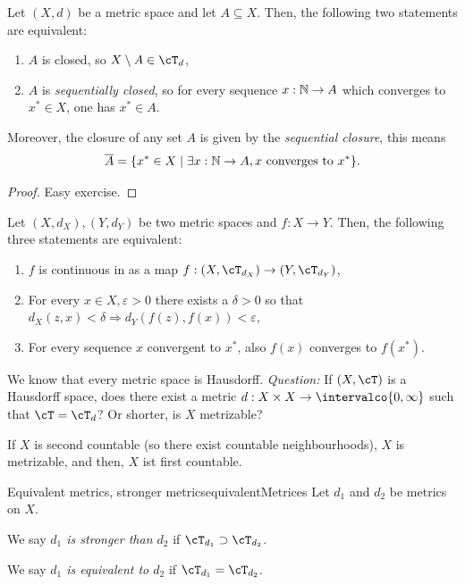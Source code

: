 \documentclass[language=english]{../../Template/TemplateLecture}
\begin{document}
\begin{prop}
    Let $(X,d)$ be a metric space and let $A \subseteq X$. Then, the following two statements are equivalent:
    \begin{enumerate}[$(i)$]
        \item $A$ is closed, so $X \setminus A \in \cT_d$,
        \item $A$ is \emph{sequentially closed}, so for every sequence $x: \mathbb{N} \to A$ which converges to $x^* \in X$, one has $x^* \in A$.
    \end{enumerate}
    Moreover, the closure of any set $A$ is given by the \emph{sequential closure}, this means 
    \begin{equation}
        \overline{A} = \{x^* \in X \mid \exists x: \mathbb{N} \to A, \text{$x$ converges to $x^*$}\}.
    \end{equation}
\end{prop}

\begin{proof}
    Easy exercise.
\end{proof}

\begin{prop}
    Let $(X, d_X), (Y, d_Y)$ be two metric spaces and $f: X \to Y$. Then, the following three statements are equivalent:
    \begin{enumerate}[$(i)$]
        \item $f$ is continuous in as a map $f: (X, \cT_{d_X}) \to (Y, \cT_{d_Y})$,
        \item For every $x\in X, \varepsilon > 0$ there exists a $\delta > 0$ so that $d_X(z,x) < \delta \Rightarrow d_Y(f(z), f(x)) < \varepsilon$,
        \item For every sequence $x$ convergent to $x^*$, also $f(x)$ converges to $f(x^*)$.
    \end{enumerate}
\end{prop}

We know that every metric space is Hausdorff. \emph{Question:} If $(X, \cT)$ is a Hausdorff space, does there exist a metric $d: X \times X \to \intervalco{0,\infty}$ such that $\cT = \cT_d$? Or shorter, is $X$ metrizable?

If $X$ is second countable (so there exist countable neighbourhoods), $X$ is metrizable, and then, $X$ ist first countable.

\begin{defi}{Equivalent metrics, stronger metrics}{equivalentMetrices}
    Let $d_1$ and $d_2$ be metrics on $X$. 
    
    We say \emph{$d_1$ is stronger than $d_2$} if $\cT_{d_1} \supset \cT_{d_2}$.

    We say \emph{$d_1$ is equivalent to $d_2$} if $\cT_{d_1} = \cT_{d_2}$.
\end{defi}
\end{document}
